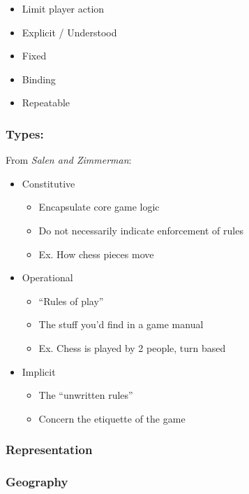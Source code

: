 \documentclass{standalone}
\begin{document}
\begin{itemize}
\tightlist
\item
  Limit player action
\item
  Explicit / Understood
\item
  Fixed
\item
  Binding
\item
  Repeatable
\end{itemize}

\subsubsection{Types:}\label{types}

From \emph{Salen and Zimmerman}:

\begin{itemize}
\tightlist
\item
  Constitutive

  \begin{itemize}
  \item
    Encapsulate core game logic
  \item
    Do not necessarily indicate enforcement of rules
  \item
    Ex. How chess pieces move
  \end{itemize}
\item
  Operational

  \begin{itemize}
  \item
    ``Rules of play''
  \item
    The stuff you'd find in a game manual
  \item
    Ex. Chess is played by 2 people, turn based
  \end{itemize}
\item
  Implicit

  \begin{itemize}
  \item
    The ``unwritten rules''
  \item
    Concern the etiquette of the game
  \end{itemize}
\end{itemize}

\subsubsection{Representation}\label{representation}

\subsubsection{Geography}\label{geography}
\end{document}
